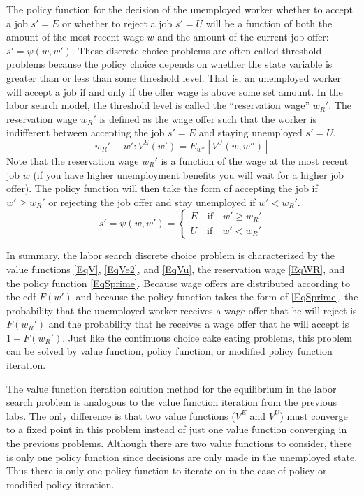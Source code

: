 The policy function for the decision of the unemployed worker whether to accept a job $s'=E$ or whether to reject a job $s'=U$ will be a function of both the amount of the most recent wage $w$ and the amount of the current job offer: $s' = \psi(w,w')$. These discrete choice problems are often called threshold problems because the policy choice depends on whether the state variable is greater than or less than some threshold level. That is, an unemployed worker will accept a job if and only if the offer wage is above some set amount. In the labor search model, the threshold level is called the ``reservation wage'' $w_R'$. The reservation wage $w_R'$ is defined as the wage offer such that the worker is indifferent between accepting the job $s' = E$ and staying unemployed $s' = U$.
\begin{equation}\label{EqWR}
   w_R' \equiv w': V^E(w') = E_{w''}\left[V^U(w,w'')\right]
\end{equation}
Note that the reservation wage $w_R'$ is a function of the wage at the most recent job $w$ (if you have higher unemployment benefits you will wait for a higher job offer). The policy function will then take the form of accepting the job if $w' \geq w_R'$ or rejecting the job offer and stay unemployed if $w' < w_R'$.
\begin{equation}\label{EqSprime}
   s' = \psi(w,w') = \begin{cases}
                      E \quad\text{if}\quad w' \geq w_R' \\
                      U \quad\text{if}\quad w' < w_R'
                   \end{cases}
\end{equation}

In summary, the labor search discrete choice problem is characterized by the value functions \eqref{EqV}, \eqref{EqVe2}, and \eqref{EqVu}, the reservation wage \eqref{EqWR}, and the policy function \eqref{EqSprime}. Because wage offers are distributed according to the cdf $F(w')$ and because the policy function takes the form of \eqref{EqSprime}, the probability that the unemployed worker receives a wage offer that he will reject is $F(w_R')$ and the probability that he receives a wage offer that he will accept is $1 - F(w_R')$. Just like the continuous choice cake eating problems, this problem can be solved by value function, policy function, or modified policy function iteration.

The value function iteration solution method for the equilibrium in the labor search problem is analogous to the value function iteration from the previous labs. The only difference is that two value functions ($V^E$ and $V^U$) must converge to a fixed point in this problem instead of just one value function converging in the previous problems.  Although there are two value functions to consider, there is only one policy function since decisions are only made in the unemployed state.  Thus there is only one policy function to iterate on in the case of policy or modified policy iteration.

